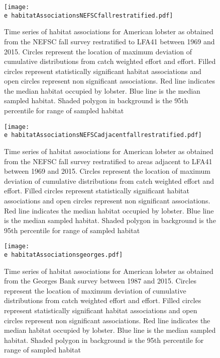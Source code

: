 \documentclass[11pt]{article}
\newcommand{\e}{/backup/bio_data/bio.lobster/figures/} %
\begin{document}
\begin{figure}

    \texttt{[image: \\e habitatAssociationsNEFSCfallrestratified.pdf]}
    \caption{Time series of habitat associations for American lobster as obtained from the NEFSC fall survey restratified to LFA41 between 1969 and 2015. Circles represent the location of maximum deviation of cumulative distributions from catch weighted effort and effort. Filled circles represent statistically significant habitat associations and open circles represent non significant associations. Red line indicates
the median habitat occupied by lobster. Blue line is the median sampled habitat. Shaded polygon in background is the 95th percentile for range of sampled habitat}

\end{figure}



\begin{figure}

    \texttt{[image: \\e habitatAssociationsNEFSCadjacentfallrestratified.pdf]}
    \caption{Time series of habitat associations for American lobster as obtained from the NEFSC fall survey  restratified to areas adjacent to LFA41 between 1969 and 2015. Circles represent the location of maximum deviation of cumulative distributions from catch weighted effort and effort. Filled circles represent statistically significant habitat associations and open circles represent non significant associations. Red line indicates
the median habitat occupied by lobster. Blue line is the median sampled habitat. Shaded polygon in background is the 95th percentile for range of sampled habitat}

\end{figure}


\begin{figure}

    \texttt{[image: \\e habitatAssociationsgeorges.pdf]}
    \caption{Time series of habitat associations for American lobster as obtained from the Georges Bank survey between 1987 and 2015. Circles represent the location of maximum deviation of cumulative distributions from catch weighted effort and effort. Filled circles represent statistically significant habitat associations and open circles represent non significant associations. Red line indicates the median habitat occupied by lobster. Blue line is the median sampled habitat. Shaded polygon in background is the 95th percentile for range of sampled habitat}

\end{figure}
\end{document}
